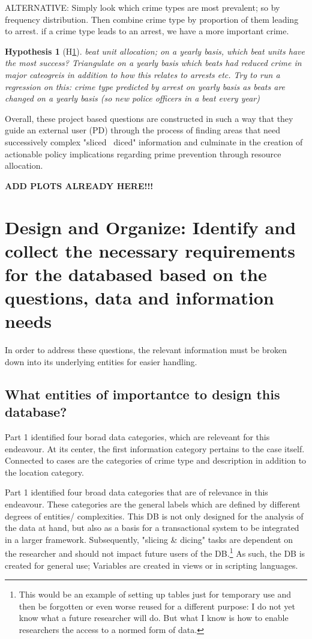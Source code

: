 \documentclass[a4paper]{article}
\newtheorem{hyp}{Hypothesis}
\begin{document}
ALTERNATIVE: Simply look which crime types are most prevalent; so by frequency distribution. Then combine crime type by proportion of them leading to arrest. if a crime type leads to an arrest, we have a more important crime.






\begin{hyp}[H\ref{hyp:fourth}] \label{hyp:fourth}
beat unit allocation; on a yearly basis, which beat units have the most success? Triangulate on a yearly basis which beats had reduced crime in major cateogreis in addition to how this relates to arrests etc. Try to run a regression on this: crime type predicted by arrest on yearly basis as beats are changed on a yearly basis (so new police officers in a beat every year)
\end{hyp}

Overall, these project based questions are constructed in such a way that they guide an external user (PD) through the process of finding areas that need successively complex "sliced \ diced" information and culminate in the creation of actionable policy implications regarding prime prevention through resource allocation.


\textbf{ADD PLOTS ALREADY HERE!!!}

\section{Design and Organize: Identify and collect the necessary requirements for the databased based on the questions, data and information needs}
In order to address these questions, the relevant information must be broken down into its underlying entities for easier handling. 

\subsection{What entities of importantce to design this database?}
Part 1 identified four borad data categories, which are releveant for this endeavour. At its center, the first information category pertains to the case itself. Connected to cases are the categories of crime type and description in addition to the location category. 
 
 
 
 


Part 1 identified four broad data categories that are of relevance in this endeavour. These categories are the general labels which are defined by different degrees of entities/ complexities. This DB is not only designed for the analysis of the data at hand, but also as a basis for a transactional system to be integrated in a larger framework. Subsequently, "slicing \& dicing" tasks are dependent on the researcher and should not impact future users of the DB.\footnote{This would be an example of setting up tables just for temporary use and then be forgotten or even worse reused for a different purpose: I do not yet know what a future researcher will do. But what I know is how to enable researchers the access to a normed form of data.} As such, the DB is created for general use; Variables are created in views or in scripting languages. 
\end{document}
